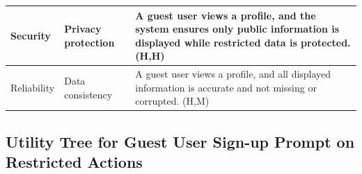 \documentclass{article}
\begin{document}
\begin{table}[H]
\begin{tabular}{|p{3cm}|p{4cm}|p{7cm}|}
        Security
                                   & Privacy protection
                                   & A guest user views a profile, and the system ensures only public information is displayed while restricted data is protected. (H,H)                \\
        \hline

        Reliability
                                   & Data consistency
                                   & A guest user views a profile, and all displayed information is accurate and not missing or corrupted. (H,M)                                        \\
        \hline
    \end{tabular}
\end{table}

\subsection{Utility Tree for Guest User Sign-up Prompt on Restricted Actions}
\end{document}
